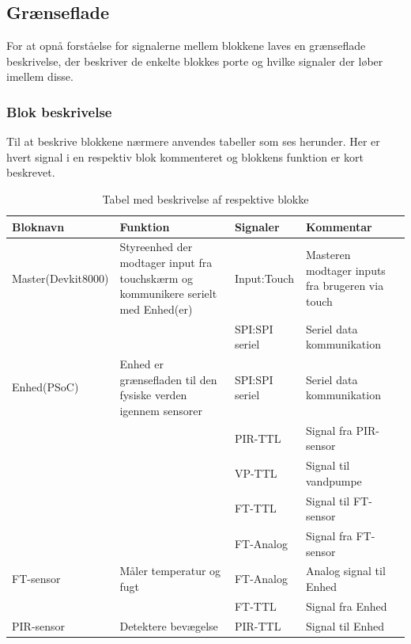 \begin{table}[H] %
\subsection{Grænseflade}
For at opnå forståelse for signalerne mellem blokkene laves en grænseflade beskrivelse, der beskriver de enkelte blokkes porte og hvilke signaler der løber imellem disse.

\subsubsection{Blok beskrivelse}
Til at beskrive blokkene nærmere anvendes tabeller som ses herunder. Her er hvert signal i en respektiv blok kommenteret og blokkens funktion er kort beskrevet. 

\caption{Tabel med beskrivelse af respektive blokke}
\begin{small}
\begin{tabular}{|p{}|p{}|p{}|p{}|}
\hline
\textbf{Bloknavn} & \textbf{Funktion} & \textbf{Signaler} & \textbf{Kommentar} \\ \hline

Master(Devkit8000) & Styreenhed der modtager input fra touchskærm og kommunikere serielt med Enhed(er) & Input:Touch & Masteren modtager inputs fra brugeren via touch \\ \cline{3-4}	
& 				   & SPI:SPI seriel & Seriel data kommunikation \\ \hline

Enhed(PSoC) & Enhed er grænsefladen til den fysiske verden igennem sensorer & SPI:SPI seriel & Seriel data kommunikation \\ \cline{3-4}
& & PIR-TTL 		& Signal fra PIR-sensor	\\ \cline{3-4}
& & VP-TTL 		& Signal til vandpumpe 	\\ \cline{3-4}
& & FT-TTL 		& Signal til FT-sensor 	\\ \cline{3-4}
& & FT-Analog 	& Signal fra FT-sensor 	\\ \hline

FT-sensor & Måler temperatur og fugt & FT-Analog & Analog signal til Enhed \\ \cline{3-4}
& & FT-TTL 	& Signal fra Enhed 	\\ \hline

PIR-sensor & Detektere bevægelse & PIR-TTL & Signal til Enhed \\ \hline


\end{tabular}
\end{small}
\end{table}
